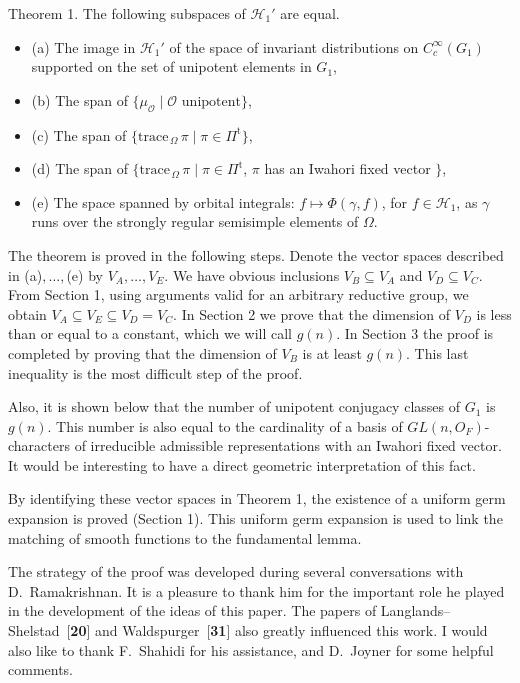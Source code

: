 \documentclass{amsart}
\begin{document}
\bigskip
\proclaim Theorem 1.  
  The following subspaces of 
  $ {\mathcal H}_1' $ are equal.
\begin{itemize}
\item{{\rm (a)}}
  The image in 
    $ {\mathcal H}_1' $
  of the space of invariant distributions on
    $ C_c^{\infty}  (G_1) $
  supported on the set of unipotent elements in $G_1$,
\item{{\rm (b)}}
  The span of 
    $ \{ \mu_{\mathcal O} \mid \mathcal O \text{ unipotent}\} $,
\item{{\rm (c)}}
  The span of 
    $ \{ \text{trace}_{\,\Omega}\,\pi \mid
         \pi \in \Pi^{\text{t}} \} $,
\item{{\rm (d)}} 
  The span of
    $ \{ \text{trace}_{\,\Omega}\,\pi \mid
         \pi \in \Pi^{\text{t}} $, 
    $ \pi $
    has an Iwahori fixed vector $\}$,
\item{{\rm (e)}}
  The space spanned by orbital integrals:
    $ f \mapsto \Phi (\gamma, f) $, for
    $ f \in {\mathcal H}_1 $,
  as $\gamma$ runs over the strongly regular semisimple
  elements of 
  $ \Omega $.
\end{itemize}
\finishproclaim

\medskip
\noindent
The theorem is proved in the following steps.
Denote the vector spaces described in (a)$,\dots,$(e) by
  $ V_A,\ldots,V_E$.
We have obvious inclusions
  $ V_B \subseteq V_A$ and $V_D \subseteq V_C $.
From Section 1, using arguments valid for an arbitrary
  reductive group, we obtain
  $ V_A \subseteq V_E \subseteq V_D = V_C $.
In Section 2 we prove that the dimension of $V_D$ is less than or
equal to a constant, which we will call $g(n)$.
In Section 3 the proof is completed by proving that the dimension
of $V_B$ is at least $g(n)$.
This last inequality is the most difficult step of the proof.

Also, it is shown below that the number of unipotent conjugacy classes of
$G_1$ is 
    $ g(n) $.
    This number is also
  equal to the cardinality of a basis of $GL(n,O_F)$-characters
  of irreducible admissible representations with an Iwahori fixed vector.
It would be interesting to have a direct geometric interpretation of 
  this fact.

By identifying these vector spaces in Theorem 1, the existence of
  a uniform germ expansion is proved (Section 1).
This uniform germ expansion is used to link the matching of 
  smooth functions to the fundamental lemma.

The strategy of the proof was developed during several conversations
  with D.~Ramakrishnan.
It is a pleasure to thank him for the important role he played in
  the development of the ideas of this paper.
The papers of Langlands--Shelstad~[{\bf 20}] and Waldspurger~[{\bf 31}]
  also greatly influenced this work.
I would also like to thank F.~Shahidi for his assistance, and D.~Joyner 
  for some helpful comments.
\end{document}
